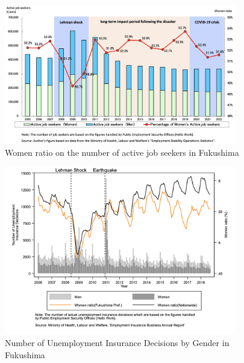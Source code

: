 \documentclass[a4paper,12pt]{article}
\begin{document}

\begin{figure}[h!]
    \centering
    \includegraphics[width=0.9\textwidth]{Women ratio on the number of active job seekers2.jpeg}  %
    \caption{Women ratio on the number of active job seekers in Fukushima}
    \label{fig:women_ratio_fukushima}
\end{figure}



\begin{figure}[h!]
    \centering
    \includegraphics[width=0.9\textwidth]{Number of Unemployment Insurance decisions.jpg}  %
    \caption{Number of Unemployment Insurance Decisions by Gender in Fukushima}
    \label{fig:employment_insurance_decisions}
\end{figure}
\end{document}
